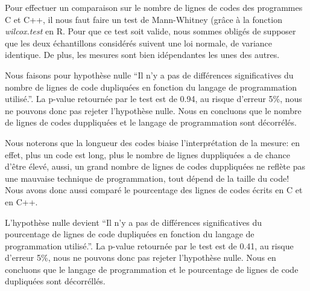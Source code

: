 Pour effectuer un comparaison sur le nombre de lignes de codes des
programmes C et C++, il nous faut faire un test de Mann-Whitney (grâce
à la fonction \emph{wilcox.test} en R. Pour que ce test soit valide,
nous sommes obligés de supposer que les deux échantillons considérés
suivent une loi normale, de variance identique. De plus, les mesures
sont bien idépendantes les unes des autres.  

Nous faisons pour hypothèse nulle ``Il n'y a pas de différences
significatives du nombre de lignes de code dupliquées en fonction du
langage de programmation utilisé.''. La p-value retournée par le test
est de 0.94, au risque d'erreur 5\%, nous ne pouvons donc pas rejeter
l'hypothèse nulle. Nous en concluons que le nombre de lignes de codes
duppliquées et le langage de programmation sont décorrélés.

Nous noterons que la longueur des codes biaise l'interprétation de la
mesure: en effet, plus un code est long, plus le nombre de lignes
duppliquées a de chance d'être élevé, aussi, un grand nombre de lignes
de codes duppliquées ne reflète pas une mauvaise technique de
programmation, tout dépend de la taille du code!  Nous avons donc
aussi comparé le pourcentage des lignes de codes écrits en C et en
C++.  

L'hypothèse nulle devient ``Il n'y a pas de différences significatives
du pourcentage de lignes de code dupliquées en fonction du langage de
programmation utilisé.''.  La p-value retournée par le test est de
0.41, au risque d'erreur 5\%, nous ne pouvons donc pas rejeter
l'hypothèse nulle. Nous en concluons que le langage de programmation et
le pourcentage de lignes de code dupliquées sont décorréllés.

